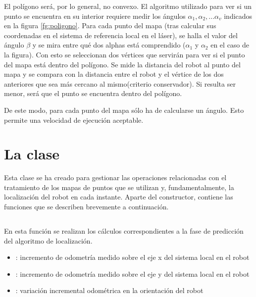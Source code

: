 El polígono será, por lo general, no convexo. El algoritmo utilizado para ver si un punto se encuentra en su interior requiere medir los ángulos $\alpha_{1},\alpha_{2},...\alpha_{v}$ indicados en la figura \ref{fg:poligono}. Para cada punto del mapa (tras calcular sus coordenadas en el sistema de referencia local en el láser), se halla el valor del ángulo $\beta$ y se mira entre qué dos alphas está comprendido ($\alpha_{1}$ y $\alpha_{2}$ en el caso de la figura). Con esto se seleccionan dos vértices que servirán para ver si el punto del mapa está dentro del polígono. Se mide la distancia del robot al punto del mapa y se compara con la distancia entre el robot y el vértice de los dos anteriores que sea más cercano al mismo(criterio conservador). Si resulta ser menor, será que el punto se encuentra dentro del polígono.

De este modo, para cada punto del mapa sólo ha de calcularse un ángulo. Esto permite una velocidad de ejecución aceptable.

\section{La clase }
Esta clase se ha creado para gestionar las operaciones relacionadas con el tratamiento de los mapas de puntos que se utilizan y, fundamentalmente, la localización del robot en cada instante. Aparte del constructor, contiene las funciones que se describen brevemente a continuación.

\subsection{}

 

En esta función se realizan los cálculos correspondientes a la fase de predicción del algoritmo de localización.

\begin{itemize}
  \item {}: incremento de odometría medido sobre el eje x del sistema local en el robot
  \item {}: incremento de odometría medido sobre el eje y del sistema local en el robot
  \item {}: variación incremental odométrica en la orientación del robot
\end{itemize}

